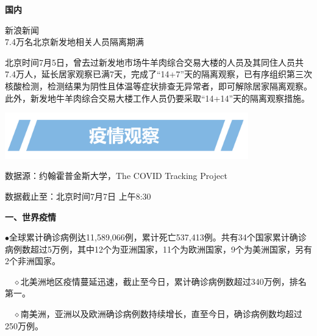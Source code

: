 \documentclass[]{article}
\begin{document}
\begin{huge}{\textcolor{glaucous}{\textbf {国内}}}\end{huge}

\vspace{-3mm}

\begin{center}
\textcolor{glaucous}{新浪新闻}\\7.4万名北京新发地相关人员隔离期满
\end{center}

北京时间7月5日，曾去过新发地市场牛羊肉综合交易大楼的人员及其同住人员共7.4万人，延长居家观察已满7天，完成了``14+7''天的隔离观察，已有序组织第三次核酸检测，检测结果为阴性且体温等症状排查无异常者，即可解除居家隔离观察。此外，新发地牛羊肉综合交易大楼工作人员仍要采取``14+14''天的隔离观察措施。

\vspace{10mm}

\begin{center}
\includegraphics[height=2cm]{./input/title2.png} 
\end{center}

\begin{Large}
\vspace{-7mm}
{数据源：约翰霍普金斯大学，The COVID Tracking  Project}
\end{Large}

\vspace{-7mm}

\begin{Large}
{数据截止至：北京时间7月7日 上午8:30}
\end{Large}

\begin{huge}{\textcolor{glaucous}{\textbf {一、世界疫情}}}\end{huge}

\vspace{-5mm}

\(\bullet\)全球累计确诊病例达11,589,066例，累计死亡537,413例。共有34个国家累计确诊病例数超过5万例，其中12个为亚洲国家，11个为欧洲国家，9个为美洲国家，另有2个非洲国家。

\(\quad\)\(\diamond\)北美洲地区疫情蔓延迅速，截止至今日，累计确诊病例数超过340万例，排名第一。

\(\quad\)\(\diamond\)南美洲，亚洲以及欧洲确诊病例数持续增长，直至今日，确诊病例数均超过250万例。
\end{document}
